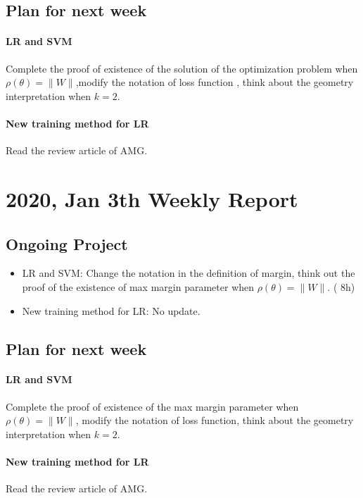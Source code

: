 \documentclass[10pt]{amsart}
\begin{document}
\subsection{Plan for next week}
\paragraph{LR and SVM}

Complete the proof of existence of the solution of the optimization problem when $\rho(\theta) = \|W\|$,modify the notation of loss function , think about the geometry interpretation when $k = 2$.
\paragraph{New training method for LR}
Read the review article of AMG.


\section{2020, Jan 3th Weekly Report }

\subsection{Ongoing Project}
\begin{itemize}
	\item LR and SVM: {\color{red} Change the notation in the definition of margin, think out the proof of the existence of max margin parameter when $\rho(\theta) = \|W\|$.} ({\color{blue} 8h})
	\item New training method for LR: No update.
	
\end{itemize}

\subsection{Plan for next week}
\paragraph{LR and SVM}
Complete the proof of existence of the max margin parameter when $\rho(\theta) = \|W\|$, modify the notation of loss function, think about the geometry interpretation when $k = 2$.
\paragraph{New training method for LR}
Read the review article of AMG.
\end{document}
